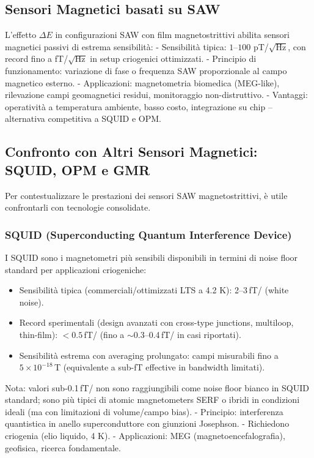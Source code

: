 \documentclass[11pt,a4paper]{article}
\begin{document}
\subsection{Sensori Magnetici basati su SAW}

L'effetto $\Delta E$ in configurazioni SAW con film magnetostrittivi abilita sensori magnetici passivi di estrema sensibilità:
- Sensibilità tipica: $1$–$100$ pT/$\sqrt{\text{Hz}}$, con record fino a fT/$\sqrt{\text{Hz}}$ in setup criogenici ottimizzati.
- Principio di funzionamento: variazione di fase o frequenza SAW proporzionale al campo magnetico esterno.
- Applicazioni: magnetometria biomedica (MEG-like), rilevazione campi geomagnetici residui, monitoraggio non-distruttivo.
- Vantaggi: operatività a temperatura ambiente, basso costo, integrazione su chip – alternativa competitiva a SQUID e OPM.


\subsection{Confronto con Altri Sensori Magnetici: SQUID, OPM e GMR}

Per contestualizzare le prestazioni dei sensori SAW magnetostrittivi, è utile confrontarli con tecnologie consolidate.

\subsubsection{SQUID (Superconducting Quantum Interference Device)}

I SQUID sono i magnetometri più sensibili disponibili in termini di noise floor standard per applicazioni criogeniche:
\begin{itemize}
    \item Sensibilità tipica (commerciali/ottimizzati LTS a 4.2 K): 2--3\,fT/ (white noise).
    \item Record sperimentali (design avanzati con cross-type junctions, multiloop, thin-film): $<0.5$\,fT/ (fino a $\sim$0.3--0.4\,fT/ in casi riportati).
    \item Sensibilità estrema con averaging prolungato: campi misurabili fino a $5 \times 10^{-18}$\,T (equivalente a sub-fT effective in bandwidth limitati).
\end{itemize}

Nota: valori sub-0.1\,fT/ non sono raggiungibili come noise floor bianco in SQUID standard; sono più tipici di atomic magnetometers SERF o ibridi in condizioni ideali (ma con limitazioni di volume/campo bias).
- Principio: interferenza quantistica in anello superconduttore con giunzioni Josephson.
- Richiedono criogenia (elio liquido, 4 K).
- Applicazioni: MEG (magnetoencefalografia), geofisica, ricerca fondamentale.
\end{document}
